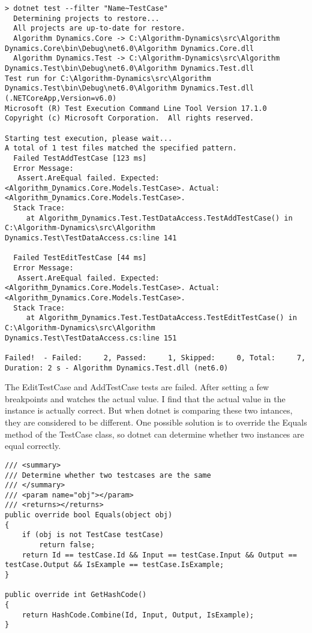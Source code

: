 \documentclass[report.tex]{subfiles}
\begin{document}
\begin{verbatim}
> dotnet test --filter "Name~TestCase"
  Determining projects to restore...
  All projects are up-to-date for restore.
  Algorithm Dynamics.Core -> C:\Algorithm-Dynamics\src\Algorithm Dynamics.Core\bin\Debug\net6.0\Algorithm Dynamics.Core.dll
  Algorithm Dynamics.Test -> C:\Algorithm-Dynamics\src\Algorithm Dynamics.Test\bin\Debug\net6.0\Algorithm Dynamics.Test.dll
Test run for C:\Algorithm-Dynamics\src\Algorithm Dynamics.Test\bin\Debug\net6.0\Algorithm Dynamics.Test.dll (.NETCoreApp,Version=v6.0)
Microsoft (R) Test Execution Command Line Tool Version 17.1.0
Copyright (c) Microsoft Corporation.  All rights reserved.

Starting test execution, please wait...
A total of 1 test files matched the specified pattern.
  Failed TestAddTestCase [123 ms]
  Error Message:
   Assert.AreEqual failed. Expected:<Algorithm_Dynamics.Core.Models.TestCase>. Actual:<Algorithm_Dynamics.Core.Models.TestCase>.
  Stack Trace:
     at Algorithm_Dynamics.Test.TestDataAccess.TestAddTestCase() in C:\Algorithm-Dynamics\src\Algorithm Dynamics.Test\TestDataAccess.cs:line 141

  Failed TestEditTestCase [44 ms]
  Error Message:
   Assert.AreEqual failed. Expected:<Algorithm_Dynamics.Core.Models.TestCase>. Actual:<Algorithm_Dynamics.Core.Models.TestCase>.
  Stack Trace:
     at Algorithm_Dynamics.Test.TestDataAccess.TestEditTestCase() in C:\Algorithm-Dynamics\src\Algorithm Dynamics.Test\TestDataAccess.cs:line 151

Failed!  - Failed:     2, Passed:     1, Skipped:     0, Total:     7, Duration: 2 s - Algorithm Dynamics.Test.dll (net6.0)
\end{verbatim}

The EditTestCase and AddTestCase tests are failed. After setting a few breakpoints and watches the actual value. I find that the actual value in the instance is actually correct. But when dotnet is comparing these two intances, they are considered to be different. One possible solution is to override the Equals method of the TestCase class, so dotnet can determine whether two instances are equal correctly.

\begin{verbatim}
/// <summary>
/// Determine whether two testcases are the same
/// </summary>
/// <param name="obj"></param>
/// <returns></returns>
public override bool Equals(object obj)
{
    if (obj is not TestCase testCase)
        return false;
    return Id == testCase.Id && Input == testCase.Input && Output == testCase.Output && IsExample == testCase.IsExample;
}

public override int GetHashCode()
{
    return HashCode.Combine(Id, Input, Output, IsExample);
}
\end{verbatim}
\end{document}
